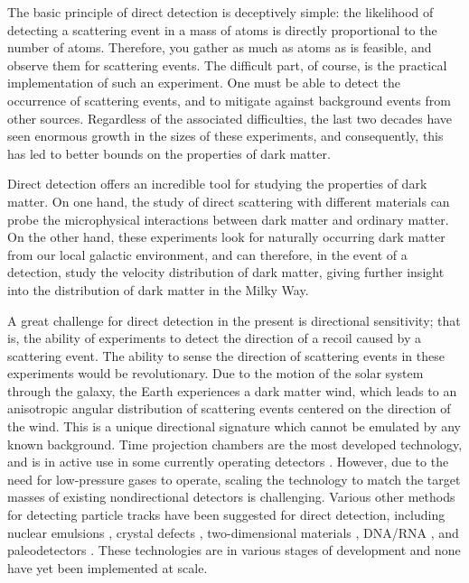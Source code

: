 \documentclass[b5paper, 10pt, twoside]{book}
\begin{document}
The basic principle of direct detection is deceptively simple: the likelihood of detecting a scattering event in a mass of atoms is directly proportional to the number of atoms. Therefore, you gather as much as atoms as is feasible, and observe them for scattering events. The difficult part, of course, is the practical implementation of such an experiment. One must be able to detect the occurrence of scattering events, and to mitigate against background events from other sources. Regardless of the associated difficulties, the last two decades have seen enormous growth in the sizes of these experiments, and consequently, this has led to better bounds on the properties of dark matter.

Direct detection offers an incredible tool for studying the properties of dark matter. On one hand, the study of direct scattering with different materials can probe the microphysical interactions between dark matter and ordinary matter. On the other hand, these experiments look for naturally occurring dark matter from our local galactic environment, and can therefore, in the event of a detection, study the velocity distribution of dark matter, giving further insight into the distribution of dark matter in the Milky Way.

A great challenge for direct detection in the present is directional sensitivity; that is, the ability of experiments to detect the direction of a recoil caused by a scattering event. The ability to sense the direction of scattering events in these experiments would be revolutionary. Due to the motion of the solar system through the galaxy, the Earth experiences a dark matter wind, which leads to an anisotropic angular distribution of scattering events centered on the direction of the wind. This is a unique directional signature which cannot be emulated by any known background. Time projection chambers are the most developed technology, and is in active use in some currently operating detectors \parencites{BattatEtAl2017, IkedaEtAl2021}. However, due to the need for low-pressure gases to operate, scaling the technology to match the target masses of existing nondirectional detectors is challenging. Various other methods for detecting particle tracks have been suggested for direct detection, including nuclear emulsions \parencite{AgafonovaEtAl2018}, crystal defects \parencites{RajendranEtAl2017, MarshallEtAl2021}, two-dimensional materials \parencites{CapparelliEtAl2015, MarshallEtAl2021, BaracchiniEtAl2018}, DNA/RNA \parencites{DrukierEtAl2012, OHareEtAl2022}, and paleodetectors \parencite{BaumEtAl2020}. These technologies are in various stages of development and none have yet been implemented at scale.
\end{document}
